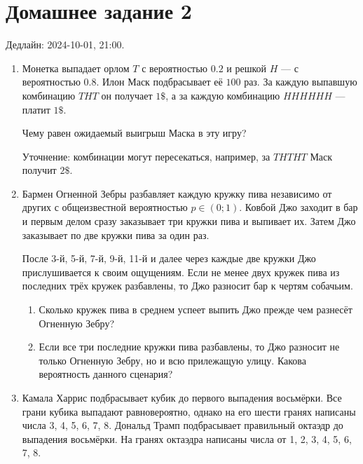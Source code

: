 \section*{Домашнее задание 2}

Дедлайн: 2024-10-01, 21:00.

\begin{enumerate}
\item Монетка выпадает орлом $T$ с вероятностью $0.2$ и решкой $H$ — с вероятностью $0.8$.
Илон Маск подбрасывает её $100$ раз. 
За каждую выпавшую комбинацию $THT$ он получает $1\$$, а за каждую комбинацию $HHHHHH$ — платит $1\$$.

Чему равен ожидаемый выигрыш Маска в эту игру?

Уточнение: комбинации могут пересекаться, например, за $THTHT$ Маск получит $2\$$.

\item Бармен Огненной Зебры разбавляет каждую кружку пива независимо от других с общеизвестной вероятностью $p \in (0;1)$.
Ковбой Джо заходит в бар и первым делом сразу заказывает три кружки пива и выпивает их.
Затем Джо заказывает по две кружки пива за один раз. 

После 3-й, 5-й, 7-й, 9-й, 11-й и далее через каждые две кружки Джо прислушивается к своим ощущениям.
Если не менее двух кружек пива из последних трёх кружек разбавлены, то Джо разносит бар к чертям собачьим. 

\begin{enumerate}
    \item Сколько кружек пива в среднем успеет выпить Джо прежде чем разнесёт Огненную Зебру?
    \item Если все три последние кружки пива разбавлены, то Джо разносит не только Огненную Зебру, 
    но и всю прилежащую улицу. Какова вероятность данного сценария?
\end{enumerate}


\item Камала Харрис подбрасывает кубик до первого выпадения восьмёрки.
Все грани кубика выпадают равновероятно, однако на его шести гранях написаны числа 3, 4, 5, 6, 7, 8.
Дональд Трамп подбрасывает правильный октаэдр до выпадения восьмёрки. 
На гранях октаэдра написаны числа от 1, 2, 3, 4, 5, 6, 7, 8.


\end{enumerate}
